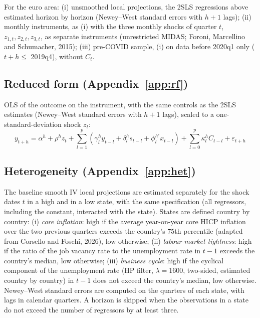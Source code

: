 \documentclass[11pt,a4paper]{article}
\begin{document}
\noindent For the euro area: (i) unsmoothed local projections, the 2SLS regressions above
estimated horizon by horizon (Newey--West standard errors with $h+1$ lags); (ii) monthly
instruments, as (i) with the three monthly shocks of quarter $t$, $z_{1,t}, z_{2,t},
z_{3,t}$, as separate instruments (unrestricted MIDAS; Foroni, Marcellino and
Schumacher, 2015); (iii) pre-COVID sample, (i) on data before 2020q1 only ($t+h \le$
2019q4), without $C_t$.

\subsection{Reduced form (Appendix~\ref{app:rf})}

\noindent OLS of the outcome on the instrument, with the same controls as the 2SLS
estimates (Newey--West standard errors with $h+1$ lags), scaled to a one-standard-deviation
shock $z_t$:
\begin{equation}
y_{t+h} = \alpha^h + \rho^h z_{t}
 + \sum_{l=1}^{p} \left( \gamma_l^h y_{t-l} + \delta_l^h s_{t-l} + \phi_l^{h\prime} x_{t-l} \right)
 + \sum_{l=0}^{p} \kappa_l^h C_{t-l} + \varepsilon_{t+h}
\end{equation}

\subsection{Heterogeneity (Appendix~\ref{app:het})}

\noindent The baseline smooth IV local projections are estimated separately for the shock dates
$t$ in a high and in a low state, with the same specification (all regressors, including the
constant, interacted with the state). States are defined country by country:
(i) \emph{core inflation}: high if the average year-on-year core HICP inflation over the two
previous quarters exceeds the country's 75th percentile (adapted from Corsello and Foschi,
2026), low otherwise; (ii) \emph{labour-market tightness}: high if the ratio of the job
vacancy rate to the unemployment rate in $t-1$ exceeds the country's median, low otherwise;
(iii) \emph{business cycle}: high if the cyclical component of the unemployment rate (HP
filter, $\lambda=1600$, two-sided, estimated country by country) in $t-1$ does not exceed the
country's median, low otherwise.
Newey--West standard errors are computed on the quarters of each state, with lags in calendar
quarters. A horizon is skipped when the observations in a state do not exceed the number of
regressors by at least three.
\end{document}
